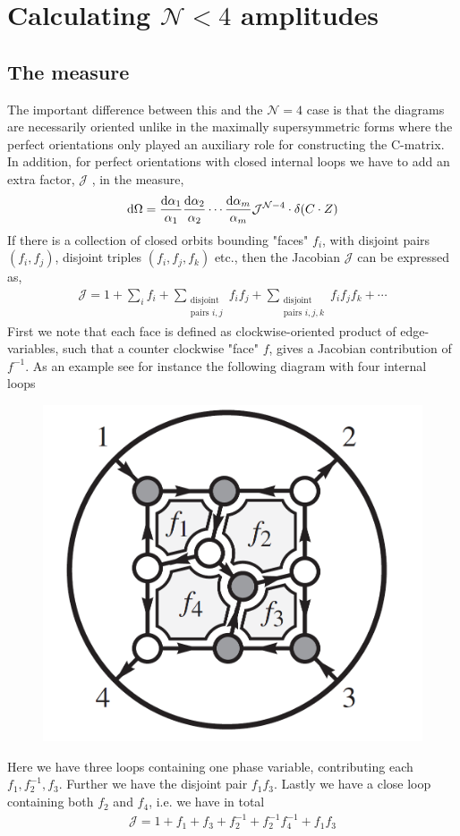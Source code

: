 \documentclass[letter,11pt]{article}
\begin{document}
\section{Calculating $\mathcal{N}<4$ amplitudes}
\subsection{The measure}
The important difference between this and the $\mathcal{N}=4$ case is that the diagrams are necessarily oriented unlike in the maximally supersymmetric forms where the perfect orientations only played an auxiliary role for constructing the C-matrix. In addition, for perfect orientations with closed internal loops we have to add an extra factor, $\mathcal{J}$ , in
the measure,
\begin{equation}
	\begin{aligned}
		\dd \Omega= \frac{\dd \alpha_1}{\alpha_1} \frac{\dd \alpha_2}{\alpha_2}\cdots  \frac{\dd \alpha_m}{\alpha_m} \mathcal{J}^{\mathcal{N}-4}\cdot \delta(C\cdot Z)
	\end{aligned}
\end{equation}
If there is a collection of closed orbits bounding "faces" $f_i$, with disjoint pairs $(f_i, f_j)$, disjoint triples $(f_i, f_j ,f_k)$ etc., then the Jacobian $\mathcal{J}$ can be expressed as,
\begin{equation}
	\begin{aligned}
		\mathcal{J}=1+\sum_if_i+\sum_{\substack{\text{disjoint}\\ \text{pairs } i,j}}f_i f_j+\sum_{\substack{\text{disjoint}\\ \text{pairs } i,j,k}}f_i f_j f_k+\cdots
	\end{aligned}
\end{equation}
First we note that each face is defined as clockwise-oriented product of edge-variables, such that a counter clockwise "face" $f$, gives a Jacobian contribution of $f^{-1}$. As an example see for instance the following diagram with four internal loops

\begin{figure}[H]
	\centering
	\includegraphics[width=0.3\linewidth]{Jexample}
	\caption{}
	\label{fig:jexample}
\end{figure}
Here we have three loops containing one phase variable, contributing each $f_1,f_2^{-1},f_{3}$. Further we have the disjoint pair $f_1f_3$. Lastly we have a close loop containing both $f_2$ and $f_4$, i.e. we have in total
\begin{equation}
	\begin{aligned}
		\mathcal{J}=1+f_1+f_3+f_2^{-1}+f_2^{-1}f_4^{-1}+f_1f_3
	\end{aligned}
\end{equation}
\end{document}
